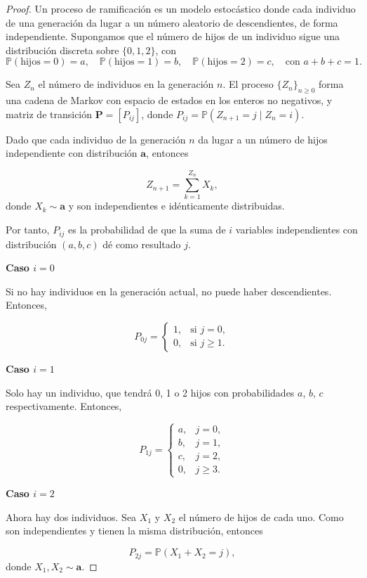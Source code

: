 \documentclass{article}
\begin{document}
\begin{proof}
Un proceso de ramificación es un modelo estocástico donde cada individuo de una generación da lugar a un número aleatorio de descendientes, de forma independiente. Supongamos que el número de hijos de un individuo sigue una distribución discreta sobre $\{0, 1, 2\}$, con
\[
\mathbb{P}(\text{hijos} = 0) = a, \quad 
\mathbb{P}(\text{hijos} = 1) = b, \quad 
\mathbb{P}(\text{hijos} = 2) = c, \quad 
\text{con } a + b + c = 1.
\]

Sea $Z_n$ el número de individuos en la generación $n$. El proceso $\{Z_n\}_{n \geq 0}$ forma una cadena de Markov con espacio de estados en los enteros no negativos, y matriz de transición $\mathbf{P} = [P_{ij}]$, donde $P_{ij} = \mathbb{P}(Z_{n+1} = j \mid Z_n = i)$.

Dado que cada individuo de la generación $n$ da lugar a un número de hijos independiente con distribución $\mathbf{a}$, entonces

\[
Z_{n+1} = \sum_{k=1}^{Z_n} X_k,
\]
donde $X_k \sim \mathbf{a}$ y son independientes e idénticamente distribuidas.

Por tanto, $P_{ij}$ es la probabilidad de que la suma de $i$ variables independientes con distribución $(a, b, c)$ dé como resultado $j$.

\textbf{Caso $i = 0$}

Si no hay individuos en la generación actual, no puede haber descendientes. Entonces,

\[
P_{0j} = 
\begin{cases}
1, & \text{si } j = 0, \\
0, & \text{si } j \geq 1.
\end{cases}
\]

\textbf{Caso $i = 1$}

Solo hay un individuo, que tendrá 0, 1 o 2 hijos con probabilidades $a$, $b$, $c$ respectivamente. Entonces,

\[
P_{1j} = 
\begin{cases}
a, & j = 0, \\
b, & j = 1, \\
c, & j = 2, \\
0, & j \geq 3.
\end{cases}
\]

\textbf{Caso $i = 2$}

Ahora hay dos individuos. Sea $X_1$ y $X_2$ el número de hijos de cada uno. Como son independientes y tienen la misma distribución, entonces

\[
P_{2j} = \mathbb{P}(X_1 + X_2 = j),
\]
donde $X_1, X_2 \sim \mathbf{a}$.


\end{proof}
\end{document}
